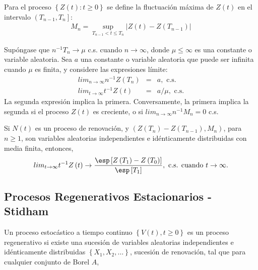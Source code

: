 \begin{Def}
Para el proceso $\left\{Z\left(t\right):t\geq0\right\}$ se define la fluctuaci\'on m\'axima de $Z\left(t\right)$ en el intervalo $\left(T_{n-1},T_{n}\right]$:
\begin{eqnarray*}
M_{n}=\sup_{T_{n-1}<t\leq T_{n}}|Z\left(t\right)-Z\left(T_{n-1}\right)|
\end{eqnarray*}
\end{Def}

\begin{Teo}
Sup\'ongase que $n^{-1}T_{n}\rightarrow\mu$ c.s. cuando $n\rightarrow\infty$, donde $\mu\leq\infty$ es una constante o variable aleatoria. Sea $a$ una constante o variable aleatoria que puede ser infinita cuando $\mu$ es finita, y considere las expresiones l\'imite:
\begin{eqnarray}
lim_{n\rightarrow\infty}n^{-1}Z\left(T_{n}\right)&=&a,\textrm{ c.s.}\\
lim_{t\rightarrow\infty}t^{-1}Z\left(t\right)&=&a/\mu,\textrm{ c.s.}
\end{eqnarray}
La segunda expresi\'on implica la primera. Conversamente, la primera implica la segunda si el proceso $Z\left(t\right)$ es creciente, o si $lim_{n\rightarrow\infty}n^{-1}M_{n}=0$ c.s.
\end{Teo}

\begin{Coro}
Si $N\left(t\right)$ es un proceso de renovaci\'on, y $\left(Z\left(T_{n}\right)-Z\left(T_{n-1}\right),M_{n}\right)$, para $n\geq1$, son variables aleatorias independientes e id\'enticamente distribuidas con media finita, entonces,
\begin{eqnarray}
lim_{t\rightarrow\infty}t^{-1}Z\left(t\right)\rightarrow\frac{\esp\left[Z\left(T_{1}\right)-Z\left(T_{0}\right)\right]}{\esp\left[T_{1}\right]},\textrm{ c.s. cuando  }t\rightarrow\infty.
\end{eqnarray}
\end{Coro}


\subsection{Procesos Regenerativos Estacionarios - Stidham \cite{Stidham}}


Un proceso estoc\'astico a tiempo continuo $\left\{V\left(t\right),t\geq0\right\}$ es un proceso regenerativo si existe una sucesi\'on de variables aleatorias independientes e id\'enticamente distribuidas $\left\{X_{1},X_{2},\ldots\right\}$, sucesi\'on de renovaci\'on, tal que para cualquier conjunto de Borel $A$, 

